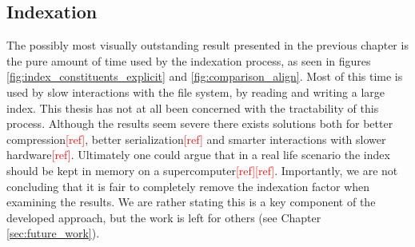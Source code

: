 \documentclass[thesis.tex]{subfiles}
\begin{document}
\subsection*{Indexation}
The possibly most visually outstanding result presented in the previous chapter is the pure amount of time used by the indexation process, as seen in figures \ref{fig:index_constituents_explicit} and \ref{fig:comparison_align}. Most of this time is used by slow interactions with the file system, by reading and writing a large index. This thesis has not at all been concerned with the tractability of this process. Although the results seem severe there exists solutions both for better compression\textcolor{red}{[ref]}, better serialization\textcolor{red}{[ref]} and smarter interactions with slower hardware\textcolor{red}{[ref]}. Ultimately one could argue that in a real life scenario the index should be kept in memory on a supercomputer\textcolor{red}{[ref]}\textcolor{red}{[ref]}. Importantly, we are not concluding that it is fair to completely remove the indexation factor when examining the results. We are rather stating this is a key component of the developed approach, but the work is left for others (see Chapter \ref{sec:future_work}).
\end{document}
